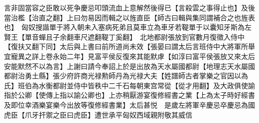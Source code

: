 言非固當容之臣敢以死争慶忌叩頭流血上意解然後得已【言殺雲之事得止也】及後當治檻【治直之翻】上曰勿易因而輯之以旌直臣【師古曰輯與集同謂補合之也旌表也】　匈奴搜諧單于將入朝未入塞病死弟且莫車立為車牙若鞮單于以囊知牙斯為左賢王【單音蟬且子余翻車尺遮翻鞮丁奚翻】　北地都尉張放到官數月復徵入侍中【復扶又翻下同】太后與上書曰前所道尚未效【張晏曰謂太后言班侍中大將軍所舉宜寵異之詳上卷永始二年】見富平侯反復來其能默虖【如淳曰富平侯張放又來太后安能默然不以為言】上謝曰請今奉詔上於是出放為天水屬國都尉【地理志天水屬國都尉治勇土縣】張少府許商光禄勲師丹為光禄大夫【姓譜師古者掌樂之官因以為氏】班伯為水衡都尉並侍中皆秩中二千石每朝東宫常從【從才用翻】及大政俱使諭指於公卿【使傳上指以諭公卿也】上亦稍厭游宴復修經書之業【上為太子時好經書及即位幸酒樂宴樂今出放等復修經書業】太后甚悦　是歲左將軍辛慶忌卒慶忌為國虎臣【爪牙扞禦之臣曰虎臣】遭世承平匈奴西域親附敬其威信

